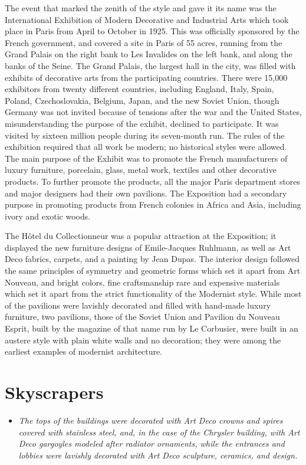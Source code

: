 The event that marked the zenith of the style and gave it its name was
the International Exhibition of Modern Decorative and Industrial Arts
which took place in Paris from April to October in 1925. This was
officially sponsored by the French government, and covered a site in
Paris of 55 acres, running from the Grand Palais on the right bank to
Les Invalides on the left bank, and along the banks of the Seine. The
Grand Palais, the largest hall in the city, was filled with exhibits of
decorative arts from the participating countries. There were 15,000
exhibitors from twenty different countries, including England, Italy,
Spain, Poland, Czechoslovakia, Belgium, Japan, and the new Soviet Union,
though Germany was not invited because of tensions after the war and the
United States, misunderstanding the purpose of the exhibit, declined to
participate. It was visited by sixteen million people during its
seven-month run. The rules of the exhibition required that all work be
modern; no historical styles were allowed. The main purpose of the
Exhibit was to promote the French manufacturers of luxury furniture,
porcelain, glass, metal work, textiles and other decorative products. To
further promote the products, all the major Paris department stores and
major designers had their own pavilions. The Exposition had a secondary
purpose in promoting products from French colonies in Africa and Asia,
including ivory and exotic woods.

The Hôtel du Collectionneur was a popular attraction at the Exposition;
it displayed the new furniture designs of Emile-Jacques Ruhlmann, as
well as Art Deco fabrics, carpets, and a painting by Jean Dupas. The
interior design followed the same principles of symmetry and geometric
forms which set it apart from Art Nouveau, and bright colors, fine
craftsmanship rare and expensive materials which set it apart from the
strict functionality of the Modernist style. While most of the pavilions
were lavishly decorated and filled with hand-made luxury furniture, two
pavilions, those of the Soviet Union and Pavilion du Nouveau Esprit,
built by the magazine of that name run by Le Corbusier, were built in an
austere style with plain white walls and no decoration; they were among
the earliest examples of modernist architecture.

\section{Skyscrapers}\label{skyscrapers}

\begin{itemize}
\item
  \emph{The tops of the buildings were decorated with Art Deco crowns
  and spires covered with stainless steel, and, in the case of the
  Chrysler building, with Art Deco gargoyles modeled after radiator
  ornaments, while the entrances and lobbies were lavishly decorated
  with Art Deco sculpture, ceramics, and design.}
\end{itemize}

